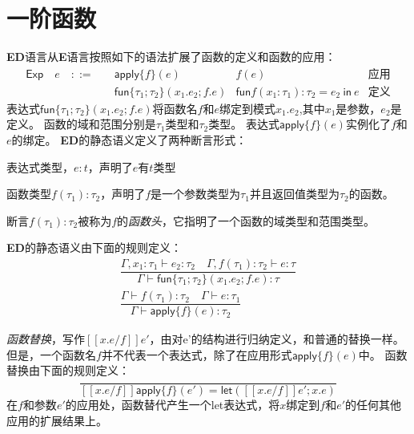 \section{一阶函数}
\textbf{ED}语言从\textbf{E}语言按照如下的语法扩展了函数的定义和函数的应用：
$$
\begin{array}{llll}
\mathsf{Exp}\quad e \quad ::= \quad &\mathsf{apply}\{f\}(e)    &f(e)    &\text{应用}\\
                                    &\mathsf{fun}\{\tau_1;\tau_2\}(x_1.e_2;f.e)    &\mathsf{fun} f(x_1:\tau_1):\tau_2 = e_2  \mathsf{\ in\ }  e    &\text{定义}
\end{array}
$$
表达式$\mathsf{fun} \{\tau_1;\tau_2\}({x_1}.{e_2};f.e)$将函数名$f$和$e$绑定到模式$x_1.e_2$,其中$x_1$是参数，$e_2$是定义。
函数的域和范围分别是$\tau_1$类型和$\tau_2$类型。
表达式$\mathsf{apply} \{f\}(e)$实例化了$f$和$e$的绑定。
\textbf{ED}的静态语义定义了两种断言形式：
\begin{definition}
表达式类型，$e:t$，声明了$e$有$t$类型
\end{definition}
\begin{definition}
函数类型$f(\tau_1):\tau_2$，声明了$f$是一个参数类型为$\tau_1$并且返回值类型为$\tau_2$的函数。
\end{definition}

断言$f(\tau_1):\tau_2$被称为$f$的\textit{函数头}，它指明了一个函数的域类型和范围类型。

\textbf{ED}的静态语义由下面的规则定义：
\begin{subequations}
    \begin{gather}
        \dfrac{\Gamma,x_1:\tau_1\vdash e_2:\tau_2  \quad  \Gamma,f(\tau_1):\tau_2\vdash e:\tau}
            {\Gamma \vdash \mathsf{fun}\{\tau_1;\tau_2\}(x_1.e_2;f.e):\tau} \\
        \dfrac{\Gamma \vdash f(\tau_1):\tau_2  \quad  \Gamma\vdash e:\tau_1}
            {\Gamma \vdash \mathsf{apply}\{f\}(e):\tau_2}
    \end{gather}
\end{subequations}

\textit{函数替换}，写作$[[x.e / f]]e'$，由对e'的结构进行归纳定义，和普通的替换一样。
但是，一个函数名$f$并不代表一个表达式，除了在应用形式$\mathsf{apply}\{f\}(e)$中。
函数替换由下面的规则定义：
\begin{equation}
    \dfrac{}
        {[[x.e/ f ]]\mathsf{apply}\{f\}(e') = \mathsf{let}([[x.e/f]]e';x.e)}
\end{equation}
在$f$和参数$e'$的应用处，函数替代产生一个let表达式，将$x$绑定到$f$和$e'$的任何其他应用的扩展结果上。
    

